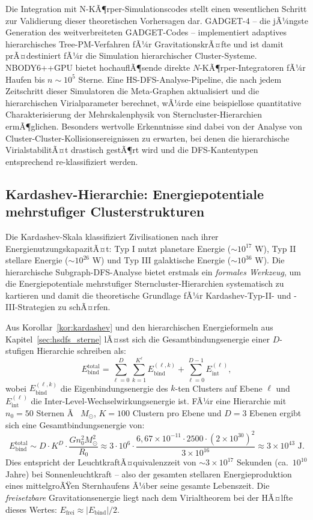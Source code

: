 ﻿\documentclass[a4paper,12pt]{report}
\theoremstyle{definition}
\begin{document}
Die Integration mit N-KÃ¶rper-Simulationscodes stellt einen wesentlichen Schritt zur Validierung dieser theoretischen Vorhersagen dar. GADGET-4 \cite{springel2021} -- die jÃ¼ngste Generation des weitverbreiteten GADGET-Codes -- implementiert adaptives hierarchisches Tree-PM-Verfahren fÃ¼r GravitationskrÃ¤fte und ist damit prÃ¤destiniert fÃ¼r die Simulation hierarchischer Cluster-Systeme. NBODY6++GPU \cite{wang2015} bietet hochauflÃ¶sende direkte $N$-KÃ¶rper-Integratoren fÃ¼r Haufen bis $n \sim 10^5$ Sterne. Eine HS-DFS-Analyse-Pipeline, die nach jedem Zeitschritt dieser Simulatoren die Meta-Graphen aktualisiert und die hierarchischen Virialparameter berechnet, wÃ¼rde eine beispiellose quantitative Charakterisierung der Mehrskalenphysik von Sterncluster-Hierarchien ermÃ¶glichen. Besonders wertvolle Erkenntnisse sind dabei von der Analyse von Cluster-Cluster-Kollisionsereignissen zu erwarten, bei denen die hierarchische VirialstabilitÃ¤t drastisch gestÃ¶rt wird und die DFS-Kantentypen entsprechend re-klassifiziert werden.

\subsection{Kardashev-Hierarchie: Energiepotentiale mehrstufiger Clusterstrukturen}

Die Kardashev-Skala \cite{kardashev1964} klassifiziert Zivilisationen nach ihrer EnergienutzungskapazitÃ¤t: Typ I nutzt planetare Energie ($\sim 10^{17}$ W), Typ II stellare Energie ($\sim 10^{26}$ W) und Typ III galaktische Energie ($\sim 10^{36}$ W). Die hierarchische Subgraph-DFS-Analyse bietet erstmals ein \emph{formales Werkzeug}, um die Energiepotentiale mehrstufiger Sterncluster-Hierarchien systematisch zu kartieren und damit die theoretische Grundlage fÃ¼r Kardashev-Typ-II- und -III-Strategien zu schÃ¤rfen.

Aus Korollar~\ref{kor:kardashev} und den hierarchischen Energieformeln aus Kapitel~\ref{sec:hsdfs_sterne} lÃ¤sst sich die Gesamtbindungsenergie einer $D$-stufigen Hierarchie schreiben als:
\[
E_\mathrm{bind}^{\mathrm{total}} = \sum_{\ell=0}^{D} \sum_{k=1}^{K^\ell} E_\mathrm{bind}^{(\ell,k)} + \sum_{\ell=0}^{D-1} E_\mathrm{int}^{(\ell)},
\]
wobei $E_\mathrm{bind}^{(\ell,k)}$ die Eigenbindungsenergie des $k$-ten Clusters auf Ebene $\ell$ und $E_\mathrm{int}^{(\ell)}$ die Inter-Level-Wechselwirkungsenergie ist. FÃ¼r eine Hierarchie mit $n_0 = 50$ Sternen Ã  $M_\odot$, $K = 100$ Clustern pro Ebene und $D = 3$ Ebenen ergibt sich eine Gesamtbindungsenergie von:
\[
E_\mathrm{bind}^{\mathrm{total}} \sim D \cdot K^D \cdot \frac{G n_0^2 M_\odot^2}{R_0} \approx 3 \cdot 10^6 \cdot \frac{6{,}67 \times 10^{-11} \cdot 2500 \cdot (2 \times 10^{30})^2}{3 \times 10^{16}} \approx 3 \times 10^{43} \text{ J}.
\]
Dies entspricht der LeuchtkraftÃ¤quivalenzzeit von $\sim 3 \times 10^{17}$ Sekunden (ca.\ $10^{10}$ Jahre) bei Sonnenleuchtkraft -- also der gesamten stellaren Energieproduktion eines mittelgroÃŸen Sternhaufens Ã¼ber seine gesamte Lebenszeit. Die \emph{freisetzbare} Gravitationsenergie liegt nach dem Virialtheorem bei der HÃ¤lfte dieses Wertes: $E_\mathrm{frei} \approx |E_\mathrm{bind}| / 2$.
\end{document}
